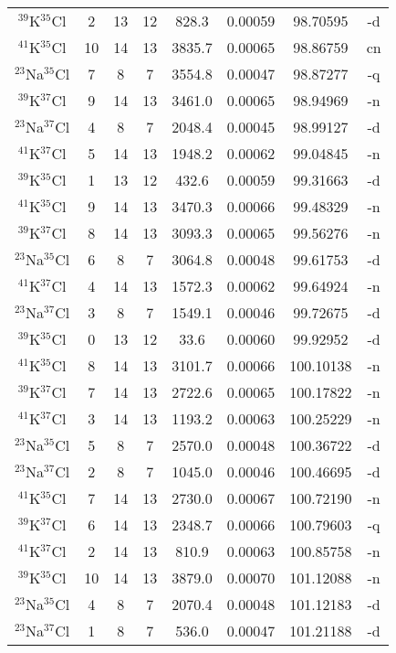 \begin{table*}[htp]
\begin{tabular}{cccccccc}
$^{39}$K$^{35}$Cl & 2 & 13 & 12 & 828.3 & 0.00059 & 98.70595 & -d \\
$^{41}$K$^{35}$Cl & 10 & 14 & 13 & 3835.7 & 0.00065 & 98.86759 & cn \\
$^{23}$Na$^{35}$Cl & 7 & 8 & 7 & 3554.8 & 0.00047 & 98.87277 & -q \\
$^{39}$K$^{37}$Cl & 9 & 14 & 13 & 3461.0 & 0.00065 & 98.94969 & -n \\
$^{23}$Na$^{37}$Cl & 4 & 8 & 7 & 2048.4 & 0.00045 & 98.99127 & -d \\
$^{41}$K$^{37}$Cl & 5 & 14 & 13 & 1948.2 & 0.00062 & 99.04845 & -n \\
$^{39}$K$^{35}$Cl & 1 & 13 & 12 & 432.6 & 0.00059 & 99.31663 & -d \\
$^{41}$K$^{35}$Cl & 9 & 14 & 13 & 3470.3 & 0.00066 & 99.48329 & -n \\
$^{39}$K$^{37}$Cl & 8 & 14 & 13 & 3093.3 & 0.00065 & 99.56276 & -n \\
$^{23}$Na$^{35}$Cl & 6 & 8 & 7 & 3064.8 & 0.00048 & 99.61753 & -d \\
$^{41}$K$^{37}$Cl & 4 & 14 & 13 & 1572.3 & 0.00062 & 99.64924 & -n \\
$^{23}$Na$^{37}$Cl & 3 & 8 & 7 & 1549.1 & 0.00046 & 99.72675 & -d \\
$^{39}$K$^{35}$Cl & 0 & 13 & 12 & 33.6 & 0.00060 & 99.92952 & -d \\
$^{41}$K$^{35}$Cl & 8 & 14 & 13 & 3101.7 & 0.00066 & 100.10138 & -n \\
$^{39}$K$^{37}$Cl & 7 & 14 & 13 & 2722.6 & 0.00065 & 100.17822 & -n \\
$^{41}$K$^{37}$Cl & 3 & 14 & 13 & 1193.2 & 0.00063 & 100.25229 & -n \\
$^{23}$Na$^{35}$Cl & 5 & 8 & 7 & 2570.0 & 0.00048 & 100.36722 & -d \\
$^{23}$Na$^{37}$Cl & 2 & 8 & 7 & 1045.0 & 0.00046 & 100.46695 & -d \\
$^{41}$K$^{35}$Cl & 7 & 14 & 13 & 2730.0 & 0.00067 & 100.72190 & -n \\
$^{39}$K$^{37}$Cl & 6 & 14 & 13 & 2348.7 & 0.00066 & 100.79603 & -q \\
$^{41}$K$^{37}$Cl & 2 & 14 & 13 & 810.9 & 0.00063 & 100.85758 & -n \\
$^{39}$K$^{35}$Cl & 10 & 14 & 13 & 3879.0 & 0.00070 & 101.12088 & -n \\
$^{23}$Na$^{35}$Cl & 4 & 8 & 7 & 2070.4 & 0.00048 & 101.12183 & -d \\
$^{23}$Na$^{37}$Cl & 1 & 8 & 7 & 536.0 & 0.00047 & 101.21188 & -d \\
\hline
\end{tabular}

\par 
\end{table*}
